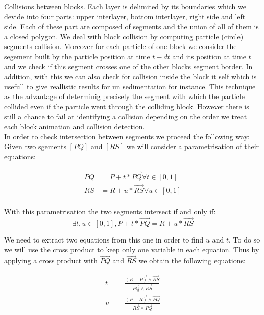 \documentclass[12pt, a4paper]{memoir} %
\begin{document}
Collisions between blocks. Each layer is delimited by its boundaries which we devide into four parts: upper interlayer, bottom interlayer, right side and left side. Each of these part are composed of segments and the union of all of them is a closed polygon. We deal with block collision by computing particle (circle) segments collision. Moreover for each particle of one block we consider the segement built by the particle position at time $t - dt$ and its position at time $t$ and we check if this segment crosses one of the other blocks segment border. In addition, with this we can also check for collision inside the block it self which is usefull to give reallistic results for un sedimentation for instance. This technique as the advantage of determinig precisely the segment with which the particle collided even if the particle went through the colliding block. However there is still a chance to fail at identifying a collision depending on the order we treat each block animation and collision detection.\\
In order to check intersection between segments we proceed the following way:\\
Given two sgements $[PQ]$ and $[RS]$ we will consider a parametrisation of their equations: 

\begin{align}
	PQ &= P + t*\overrightarrow{PQ} \forall t \in [0,1]\\
	RS &= R + u*\overrightarrow{RS} \forall u \in [0,1]\\
\end{align}

With this parametrisation the two segments intersect if and only if:\\
\begin{equation}
\exists t,u \in [0,1], P + t*\overrightarrow{PQ} = R + u*\overrightarrow{RS}
\end{equation}


We need to extract two equations from this one in order to find $u$ and $t$.
To do so we will use the cross product to keep only one variable in each equation. Thus by applying a cross product with $\overrightarrow{PQ}$ and $\overrightarrow{RS}$ we obtain the following equations:

\begin{align}
	t &= \frac{\overrightarrow{(R - P)} \wedge \overrightarrow{RS}}{\overrightarrow{PQ} \wedge \overrightarrow{RS}}\\
	u &= \frac{\overrightarrow{(P - R)} \wedge \overrightarrow{PQ}}{\overrightarrow{RS} \wedge \overrightarrow{PQ}}
\end{align}
\end{document}
